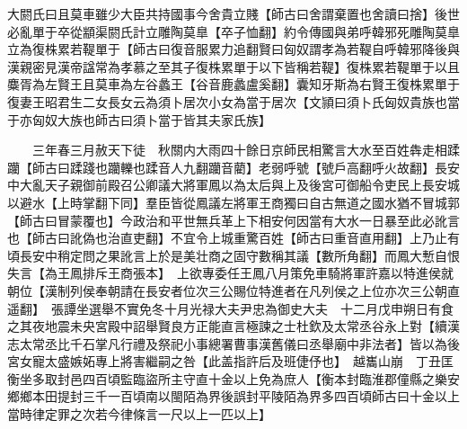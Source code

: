 大閼氏曰且莫車雖少大臣共持國事今舍貴立賤【師古曰舍謂棄置也舍讀曰捨】後世必亂單于卒從顓渠閼氏計立雕陶莫臯【卒子恤翻】約令傳國與弟呼韓邪死雕陶莫臯立為復株累若鞮單于【師古曰復音服累力追翻賢曰匈奴謂孝為若鞮自呼韓邪降後與漢親密見漢帝諡常為孝慕之至其子復株累單于以下皆稱若鞮】復株累若鞮單于以且麋胥為左賢王且莫車為左谷蠡王【谷音鹿蠡盧奚翻】囊知牙斯為右賢王復株累單于復妻王昭君生二女長女云為須卜居次小女為當于居次【文頴曰須卜氏匈奴貴族也當于亦匈奴大族也師古曰須卜當于皆其夫家氏族】

　　三年春三月赦天下徒　秋關内大雨四十餘日京師民相驚言大水至百姓犇走相蹂躪【師古曰蹂踐也躪轢也蹂音人九翻躪音藺】老弱呼號【號戶高翻呼火故翻】長安中大亂天子親御前殿召公卿議大將軍鳳以為太后與上及後宮可御船令吏民上長安城以避水【上時掌翻下同】羣臣皆從鳳議左將軍王商獨曰自古無道之國水猶不冒城郭【師古曰冒蒙覆也】今政治和平世無兵革上下相安何因當有大水一日暴至此必訛言也【師古曰訛偽也治直吏翻】不宜令上城重驚百姓【師古曰重音直用翻】上乃止有頃長安中稍定問之果訛言上於是美壮商之固守數稱其議【數所角翻】而鳳大慙自恨失言【為王鳳排斥王商張本】　上欲專委任王鳳八月策免車騎將軍許嘉以特進侯就朝位【漢制列侯奉朝請在長安者位次三公賜位特進者在凡列侯之上位亦次三公朝直遥翻】　張譚坐選舉不實免冬十月光禄大夫尹忠為御史大夫　十二月戊申朔日有食之其夜地震未央宮殿中詔舉賢良方正能直言極諫之士杜欽及太常丞谷永上對【續漢志太常丞比千石掌凡行禮及祭祀小事總署曹事漢舊儀曰丞舉廟中非法者】皆以為後宮女寵太盛嫉妬專上將害繼嗣之咎【此盖指許后及班倢伃也】　越巂山崩　丁丑匡衡坐多取封邑四百頃監臨盜所主守直十金以上免為庶人【衡本封臨淮郡僮縣之樂安鄉鄉本田提封三千一百頃南以閩陌為界後誤封平陵陌為界多四百頃師古曰十金以上當時律定罪之次若今律條言一尺以上一匹以上】

